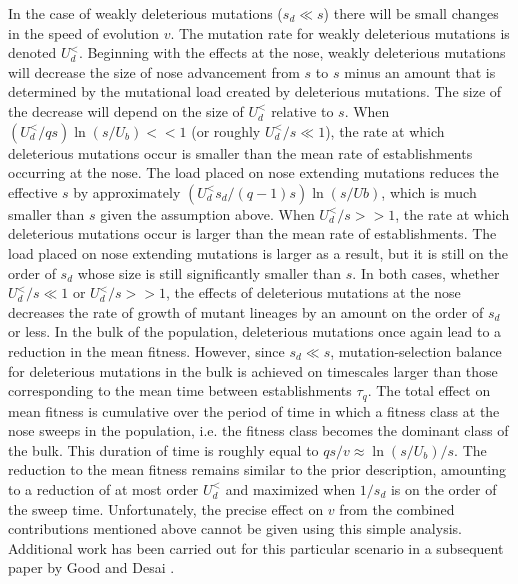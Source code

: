 \documentclass[12pt, one column]{article}
\begin{document}
In the case of weakly deleterious mutations ($s_d \ll s$) there will be small changes in the speed of evolution $v$.  The mutation rate for weakly deleterious mutations is denoted $U_d^{<}$.  Beginning with the effects at the nose, weakly deleterious mutations will decrease the size of nose advancement from $s$ to $s$ minus an amount that is determined by the mutational load created by deleterious mutations.  The size of the decrease will depend on the size of $U_d^{<}$ relative to $s$.  When $(U_d^{<} / qs)\ln(s/U_b) <<1$ (or roughly $U_d^{<}/s \ll 1$), the rate at which deleterious mutations occur is smaller than the mean rate of establishments occurring at the nose.  The load placed on nose extending mutations reduces the effective $s$ by approximately $(U_d^{<} s_d /(q-1)s)\ln(s/Ub)$, which is much smaller than $s$ given the assumption above.  When $U_d^{<} / s >> 1 $, the rate at which deleterious mutations occur is larger than the mean rate of establishments.  The load placed on nose extending mutations is larger as a result, but it is still on the order of $s_d$ whose size is still significantly smaller than $s$.  In both cases, whether $U_d^{<}/s \ll 1$ or $U_d^{<}/s >> 1$, the effects of deleterious mutations at the nose decreases the rate of growth of mutant lineages by an amount on the order of $s_d$ or less.  In the bulk of the population, deleterious mutations once again lead to a reduction in the mean fitness.  However, since $s_d \ll s$, mutation-selection balance for deleterious mutations in the bulk is achieved on timescales larger than those corresponding to the mean time between establishments $\tau_q$.  The total effect on mean fitness is cumulative over the period of time in which a fitness class at the nose sweeps in the population, i.e. the fitness class becomes the dominant class of the bulk.  This duration of time is roughly equal to $qs/v \approx \ln(s/U_b)/s$.  The reduction to the mean fitness remains similar to the prior description, amounting to a reduction of at most order $U_d^{<}$ and maximized when $1/s_d$ is on the order of the sweep time.  Unfortunately, the precise effect on $v$ from the combined contributions mentioned above cannot be given using this simple analysis.  Additional work has been carried out for this particular scenario in a subsequent paper by Good and Desai \cite{GoodDes14}.
\end{document}
